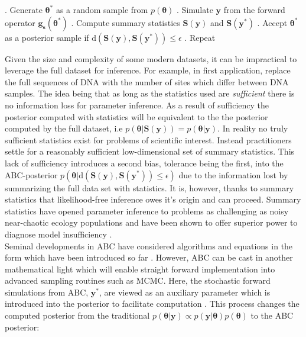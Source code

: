 \begin{algorithm}[H]
	\caption{ }
	\begin{algorithmic}
		. Generate $\bm{\theta^*}$ as a random sample from $p(\bm{\theta})$		
		. Simulate $\bm{y}$ from the forward operator $\bm{g_s}(\bm{\theta^*})$		
		. Compute summary statistics $\bm{S}(\bm{y})$ and $\bm{S}(\bm{y^*})$		
		. Accept $\bm{\theta^*}$ as a posterior sample if $\text{d}(\bm{S}(\bm{y}),\bm{S}(\bm{y^*}))\leq\epsilon$		
		. Repeat
	\end{algorithmic}
	\label{ABCrejectionsampler}
\end{algorithm}

Given the size and complexity of some modern datasets, it can be impractical to leverage the full dataset for inference. For example, in first application, \citet{Tavare1997} replace the full sequences of DNA with the number of sites which differ between DNA samples. The idea being that as long as the statistics used are \textit{sufficient} there is no information loss for parameter inference. As a result of sufficiency the posterior computed with statistics will be equivalent to the the posterior computed by the full dataset, i.e $p(\bm{\theta}|\bm{S}(\bm{y})) = p(\bm{\theta}|\bm{y})$. In reality no truly sufficient statistics exist for problems of scientific interest. Instead practitioners settle for a reasonably sufficient low-dimensional set of summary statistics. This lack of sufficiency introduces a second bias, tolerance being the first, into the ABC-posterior $p(\bm{\theta}|\text{d}(\bm{S}(\bm{y}),\bm{S}(\bm{y^*}))\leq\epsilon)$ due to the information lost by summarizing the full data set with statistics. It is, however, thanks to summary statistics that likelihood-free inference owes it's origin and can proceed. Summary statistics have opened parameter inference to problems as challenging as noisy near-chaotic ecology populations \citep{Wood2010} and have been shown to offer superior power to diagnose model insufficiency \citep{Ratmann2009,vrugt2013toward}.\\

Seminal developments in ABC have considered algorithms and equations in the form which have been introduced so far \citep{Fu1997,Pritchard1999a,Beaumont2002,Marjoram2003}. However, ABC can be cast in another mathematical light which will enable straight forward implementation into advanced sampling routines such as MCMC. Here, the stochastic forward simulations from ABC, $\bm{y^*}$, are viewed as an auxiliary parameter which is introduced into the posterior to facilitate computation \citep{Sisson2010a}. This process changes the computed posterior from the traditional $p(\bm{\theta}|\bm{y}) \propto p(\bm{y}|\bm{\theta})p(\bm{\theta})$ to the ABC posterior:

